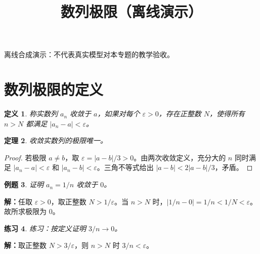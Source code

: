 \documentclass[UTF8,fontset=fandol,11pt]{ctexart}
\title{数列极限（离线演示）}
\date{}
\newtheorem{definition}{定义}[section]
\newtheorem{theorem}[definition]{定理}
\newtheorem{example}[definition]{例题}
\newtheorem{exercise}[definition]{练习}
\begin{document}
\maketitle
\par\noindent 离线合成演示：不代表真实模型对本专题的教学验收。\par
\section{数列极限的定义}
\begin{definition}
称实数列 $a_n$ 收敛于 $a$，如果对每个 $\varepsilon>0$，存在正整数 $N$，使得所有 $n>N$ 都满足 $|a_n-a|<\varepsilon$。
\end{definition}
\begin{theorem}
收敛实数列的极限唯一。
\end{theorem}
\begin{proof}
若极限 $a\ne b$，取 $\varepsilon=|a-b|/3>0$。由两次收敛定义，充分大的 $n$ 同时满足 $|a_n-a|<\varepsilon$ 和 $|a_n-b|<\varepsilon$。三角不等式给出 $|a-b|<2|a-b|/3$，矛盾。
\end{proof}
\begin{example}
证明 $a_n=1/n$ 收敛于 $0$。
\end{example}
\par\noindent\textbf{解：}任取 $\varepsilon>0$，取正整数 $N>1/\varepsilon$。当 $n>N$ 时，$|1/n-0|=1/n<1/N<\varepsilon$。故所求极限为 $0$。\par
\begin{exercise}
练习：按定义证明 $3/n\to0$。
\end{exercise}
\par\noindent\textbf{解：}取正整数 $N>3/\varepsilon$，则 $n>N$ 时 $3/n<\varepsilon$。\par
\end{document}
